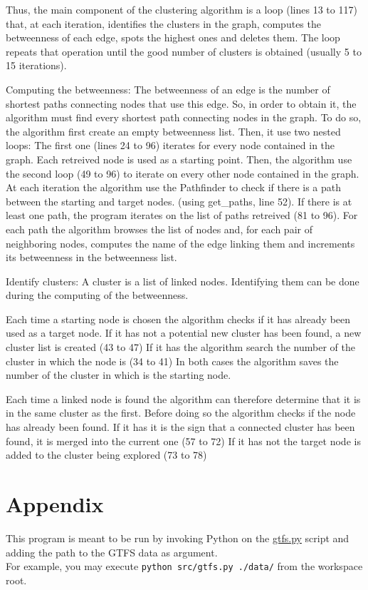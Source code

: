 \documentclass[12pt,english]{article}
\makeatletter
\let\old@appendix\appendix
\renewcommand*\appendix{
		\newpage
		\part*{Appendix}\addcontentsline{toc}{part}{Appendix}
		\old@appendix%
	}
\makeatother
\begin{document}
	Thus, the main component of the clustering algorithm is a loop (lines 13 to 117) that, at each iteration,
	identifies the clusters in the graph, computes the betweenness of each edge, spots the highest ones and deletes them.
	The loop repeats that operation until the good number of clusters is obtained (usually 5 to 15 iterations).

	Computing the betweenness:
	The betweenness of an edge is the number of shortest paths connecting nodes that use this edge.
	So, in order to obtain it, the algorithm must find every shortest path connecting nodes in the graph.
	To do so, the algorithm first create an empty betweenness list. Then, it use two nested loops:
	The first one (lines 24 to 96) iterates for every node contained in the graph.
	Each retreived node is used as a starting point.
	Then, the algorithm use the second loop (49 to 96) to iterate on every other node contained in the graph.
	At each iteration the algorithm use the Pathfinder to check if there is a path between the starting and target nodes.
	(using get_paths, line 52).
	If there is at least one path, the program iterates on the list of paths retreived (81 to 96).
	For each path the algorithm browses the list of nodes and, for each pair of neighboring nodes, computes the name of
	the edge linking them and increments its betweenness in the betweenness list.

	Identify clusters:
	A cluster is a list of linked nodes. Identifying them can be done during the computing of the betweenness.

	Each time a starting node is chosen the algorithm checks if it has already been used as a target node.
	If it has not a potential new cluster has been found, a new cluster list is created (43 to 47)
	If it has the algorithm search the number of the cluster in which the node is (34 to 41)
	In both cases the algorithm saves the number of the cluster in which is the starting node.

	Each time a linked node is found the algorithm can therefore determine that it is in the same cluster as the first.
	Before doing so the algorithm checks if the node has already been found.
	If it has it is the sign that a connected cluster has been found, it is merged into the current one (57 to 72)
	If it has not the target node is added to the cluster being explored (73 to 78)


	\appendix

	This program is meant to be run by invoking Python on the \hyperref[sec:code:gtfs]{\ttfamily gtfs.py} script and adding the path to the GTFS data as argument.\\
	For example, you may execute \texttt{python src/gtfs.py ./data/} from the workspace root.
\end{document}
